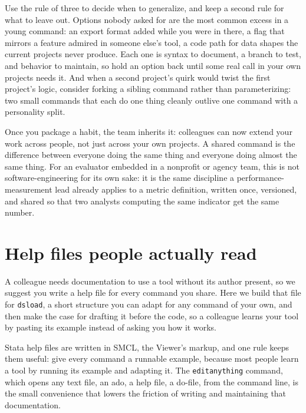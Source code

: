 Use the rule of three to decide when to generalize, and keep a second rule for what to leave out. Options nobody asked for are the most common excess in a young command: an export format added while you were in there, a flag that mirrors a feature admired in someone else's tool, a code path for data shapes the current projects never produce. Each one is syntax to document, a branch to test, and behavior to maintain, so hold an option back until some real call in your own projects needs it. And when a second project's quirk would twist the first project's logic, consider forking a sibling command rather than parameterizing: two small commands that each do one thing cleanly outlive one command with a personality split.

Once you package a habit, the team inherits it: colleagues can now extend your work across people, not just across your own projects. A shared command is the difference between everyone doing the same thing and everyone doing almost the same thing. For an evaluator embedded in a nonprofit or agency team, this is not software-engineering for its own sake: it is the same discipline a performance-measurement lead already applies to a metric definition, written once, versioned, and shared so that two analysts computing the same indicator get the same number.

\section{Help files people actually read}
A colleague needs documentation to use a tool without its author present, so we suggest you write a help file for every command you share. Here we build that file for \texttt{dsload}, a short structure you can adapt for any command of your own, and then make the case for drafting it before the code, so a colleague learns your tool by pasting its example instead of asking you how it works.

Stata help files are written in SMCL, the Viewer's markup, and one rule keeps them useful: give every command a runnable example, because most people learn a tool by running its example and adapting it. The \texttt{editanything} command, which opens any text file, an ado, a help file, a do-file, from the command line, is the small convenience that lowers the friction of writing and maintaining that documentation.

